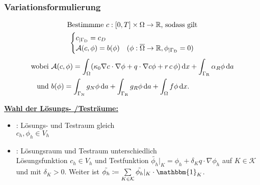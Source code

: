 
\subsubsection{Variationsformulierung}
\begin{gather*}
	\text{Bestimmme } c:[0,T] \times \Omega \to \mathbb{R} \text{, sodass gilt}\\
	\begin{cases}
		c_{|\Gamma_{\text{D}}} = c_D &\\
		\mathcal{A}(c,\phi) = b(\phi) &(\phi: \overline{\Omega} \to \mathbb{R}, \phi_{|\Gamma_{\text{D}}} = 0)
	\end{cases}
\end{gather*}
\begin{align*}
	\text{wobei } &\mathcal{A}(c,\phi) = \int_\Omega (\kappa_0 \nabla c \cdot \nabla \phi + q \cdot \nabla c \phi + r \, c \, \phi) \mathop{}\!\mathrm{d} x + \int_{\Gamma_{\text{R}}} \alpha_R \phi \mathop{}\!\mathrm{d} a\\
	\text{und } &b(\phi) = \int_{\Gamma_{\text{N}}} g_N \phi \mathop{}\!\mathrm{d} a + \int_{\Gamma_{\text{R}}} g_R \phi \mathop{}\!\mathrm{d} a + \int_\Omega f \phi \mathop{}\!\mathrm{d} x.
\end{align*}

\underline{\textbf{Wahl der Lösungs- /Testräume:}}
\begin{itemize}
	\item {}: Lösungs- und Testraum gleich\\ $ c_h, \phi_h \in V_h$
	\item {}: Lösungsraum und Testraum unterschiedlich\\ Lösungsfunktion $ c_h \in V_h $ und Testfunktion $\tilde{\phi_h}|_K  = \phi_h + \delta_K q \cdot \nabla \phi_h $ auf $ K \in \mathcal{K} $ und mit $ \delta_K > 0 $. Weiter ist $\tilde{\phi_h} \coloneqq \sum\limits_{K \in \mathcal{K}} \tilde{\phi_h}|_K \cdot \mathbbm{1}_K$.
\end{itemize}

